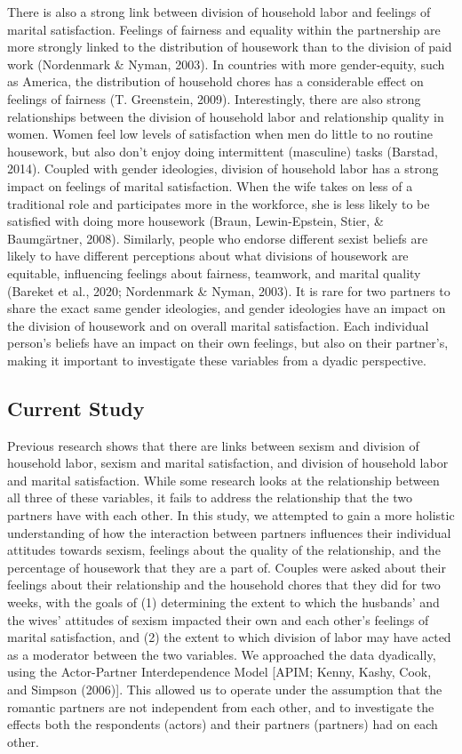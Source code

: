 \documentclass[
  man]{apa6}
\begin{document}
There is also a strong link between division of household labor and feelings of marital satisfaction. Feelings of fairness and equality within the partnership are more strongly linked to the distribution of housework than to the division of paid work (Nordenmark \& Nyman, 2003). In countries with more gender-equity, such as America, the distribution of household chores has a considerable effect on feelings of fairness (T. Greenstein, 2009). Interestingly, there are also strong relationships between the division of household labor and relationship quality in women. Women feel low levels of satisfaction when men do little to no routine housework, but also don't enjoy doing intermittent (masculine) tasks (Barstad, 2014). Coupled with gender ideologies, division of household labor has a strong impact on feelings of marital satisfaction. When the wife takes on less of a traditional role and participates more in the workforce, she is less likely to be satisfied with doing more housework (Braun, Lewin-Epstein, Stier, \& Baumgärtner, 2008). Similarly, people who endorse different sexist beliefs are likely to have different perceptions about what divisions of housework are equitable, influencing feelings about fairness, teamwork, and marital quality (Bareket et al., 2020; Nordenmark \& Nyman, 2003). It is rare for two partners to share the exact same gender ideologies, and gender ideologies have an impact on the division of housework and on overall marital satisfaction. Each individual person's beliefs have an impact on their own feelings, but also on their partner's, making it important to investigate these variables from a dyadic perspective.

\hypertarget{current-study}{%
\subsection{Current Study}\label{current-study}}

Previous research shows that there are links between sexism and division of household labor, sexism and marital satisfaction, and division of household labor and marital satisfaction. While some research looks at the relationship between all three of these variables, it fails to address the relationship that the two partners have with each other. In this study, we attempted to gain a more holistic understanding of how the interaction between partners influences their individual attitudes towards sexism, feelings about the quality of the relationship, and the percentage of housework that they are a part of. Couples were asked about their feelings about their relationship and the household chores that they did for two weeks, with the goals of (1) determining the extent to which the husbands' and the wives' attitudes of sexism impacted their own and each other's feelings of marital satisfaction, and (2) the extent to which division of labor may have acted as a moderator between the two variables. We approached the data dyadically, using the Actor-Partner Interdependence Model {[}APIM; Kenny, Kashy, Cook, and Simpson (2006){]}. This allowed us to operate under the assumption that the romantic partners are not independent from each other, and to investigate the effects both the respondents (actors) and their partners (partners) had on each other.
\end{document}

